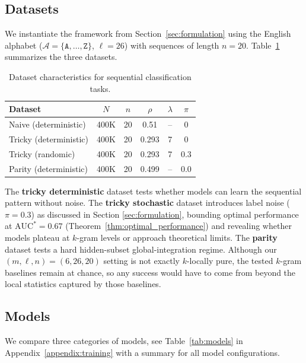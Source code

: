 \documentclass{article}
\theoremstyle{plain}
\theoremstyle{definition}
\theoremstyle{remark}
\begin{document}
\subsection{Datasets}
\label{subsec:datasets}

We instantiate the framework from Section~\ref{sec:formulation} using the English alphabet ($\mathcal{A} = \{\texttt{A}, \ldots, \texttt{Z}\}$, $\ell = 26$) with sequences of length $n = 20$. Table~\ref{tab:datasets} summarizes the three datasets.

\begin{table}[h]
\centering
\caption{Dataset characteristics for sequential classification tasks.}
\label{tab:datasets}
\begin{tabular}{lccccc}
\toprule
Dataset & $N$ & $n$ & $\rho$ & $\lambda$ & $\pi$ \\
\midrule
Naive (deterministic) & 400K  & 20 & 0.51 & -- & 0\\
Tricky (deterministic) & 400K & 20 & 0.293 & 7 & 0\\
Tricky (randomic) & 400K & 20 & 0.293 & 7 & 0.3 \\
Parity (deterministic) & 400K & 20 & 0.499 & -- & 0.0 \\
\bottomrule
\end{tabular}
\end{table}

The \textbf{tricky deterministic} dataset tests whether models can learn the sequential pattern without noise. The \textbf{tricky stochastic} dataset  introduces label noise ($\pi = 0.3$) as discussed in Section \ref{sec:formulation}, bounding optimal performance at $\text{AUC}^* = 0.67$ (Theorem~\ref{thm:optimal_performance}) and revealing whether models plateau at $k$-gram levels or approach theoretical limits. The \textbf{parity} dataset tests a hard hidden-subset global-integration regime.
Although our $(m,\ell,n)=(6,26,20)$ setting is not exactly $k$-locally pure, the tested $k$-gram baselines remain at chance, so any success would have to come from beyond the local statistics captured by those baselines.

\subsection{Models}
\label{subsec:models}

We compare three categories of models, see Table~\ref{tab:models} in Appendix~\ref{appendix:training} with a summary for all model configurations.
\end{document}

